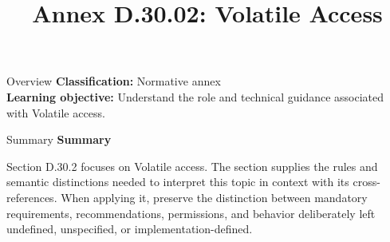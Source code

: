 \documentclass[10pt,letterpaper]{article}
\title{Annex D.30.02: Volatile Access}
\author{}
\date{}
\begin{document}
\maketitle
\begin{CornellOverviewBox}{Overview}
\textbf{Classification:} Normative annex\\[2pt]
\textbf{Learning objective:} Understand the role and technical guidance associated with Volatile access.
\end{CornellOverviewBox}\begin{CornellSummaryBox}{Summary}
{\sffamily\bfseries\color{Accent} Summary}\par\vspace{3pt}Section D.30.2 focuses on Volatile access. The section supplies the rules and semantic distinctions needed to interpret this topic in context with its cross-references. When applying it, preserve the distinction between mandatory requirements, recommendations, permissions, and behavior deliberately left undefined, unspecified, or implementation-defined.
\end{CornellSummaryBox}
\end{document}
